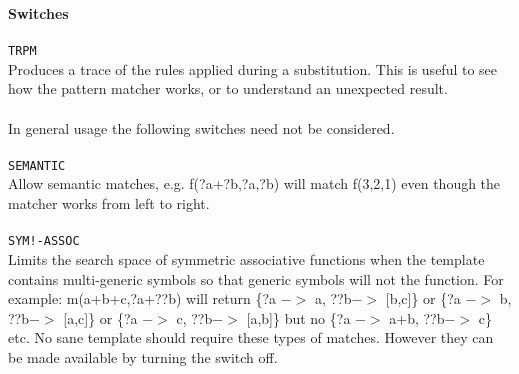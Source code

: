 {\bf Switches} \\
\ \\
{\tt TRPM} \\
Produces a trace of the rules applied during a substitution. This is
useful to see how the pattern matcher works, or to understand an
unexpected result. \\
\ \\
In general usage the following switches need not be considered. \\
\ \\
{\tt SEMANTIC} \\
Allow semantic matches, e.g. f(?a+?b,?a,?b) will match f(3,2,1) even
though the matcher works from left to right. \\
\ \\
{\tt SYM!-ASSOC} \\
Limits the search space of symmetric associative functions when the
template contains multi-generic symbols so that generic symbols will not
the function. For example: m(a+b+c,?a+??b) will return \{?a $->$ a, ??b$->$
{[}b,c{]}\} or \{?a $->$ b, ??b$->$ {[}a,c{]}\} or \{?a $->$ c, ??b$->$ {[}a,b{]}\}
but no \{?a $->$ a+b, ??b$->$ c\} etc. No sane template should require these 
types of matches. However they can be made available by turning the switch off.

